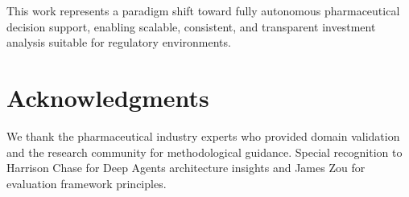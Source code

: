 \documentclass{article}
\begin{document}
This work represents a paradigm shift toward fully autonomous pharmaceutical decision support, enabling scalable, consistent, and transparent investment analysis suitable for regulatory environments.

\section*{Acknowledgments}

We thank the pharmaceutical industry experts who provided domain validation and the research community for methodological guidance. Special recognition to Harrison Chase for Deep Agents architecture insights and James Zou for evaluation framework principles.




\end{document}
